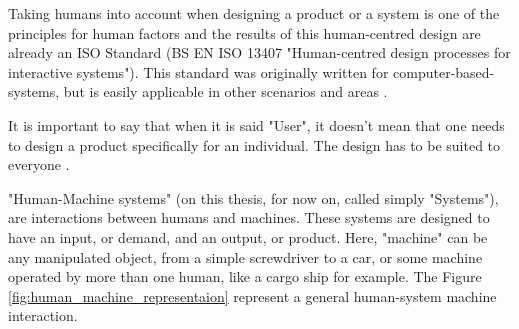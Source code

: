 Taking humans into account when designing a product or a system is one of the principles for human factors \cite{sandom2004human} and the results of this human-centred design are already an ISO Standard (BS EN ISO 13407 "Human-centred design processes for interactive systems"). This standard was originally written for computer-based-systems, but is easily applicable in other scenarios and areas \cite{sandom2004human}.

It is important to say that when it is said "User", it doesn't mean that one needs to design a product specifically for an individual. The design has to be suited to everyone \cite{dul2003ergonomics}.

"Human-Machine systems" (on this thesis, for now on, called simply "Systems"), are interactions between humans and machines. These systems are designed to have an input, or demand, and an output, or product. Here, "machine" can be any manipulated object, from a simple screwdriver to a car, or some machine operated by more than one human, like a cargo ship for example. The Figure \ref{fig:human_machine_representaion} represent a general human-system machine interaction.

